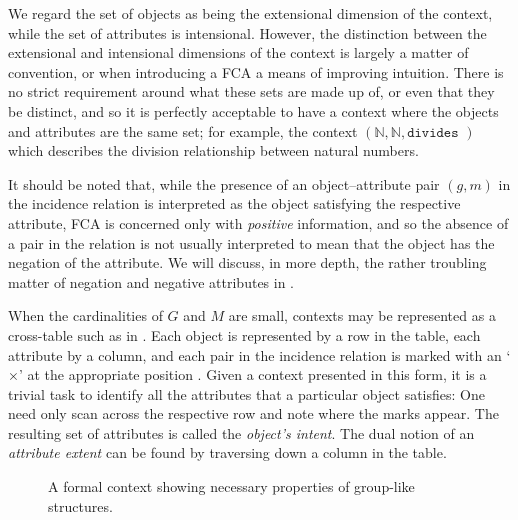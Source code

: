 We regard the set of objects as being the extensional dimension of the context, while the set of attributes is intensional. However, the
distinction between the extensional and intensional dimensions of the context is largely a matter of convention, or when introducing a FCA a
means of improving intuition. There is no strict requirement around what these sets are made up of, or even that they be distinct, and so it
is perfectly acceptable to have a context where the objects and attributes are the same set; for example, the context
$(\mathbb{N}, \mathbb{N}, \texttt{divides })$ which describes the division relationship between natural numbers.

It should be noted that, while the presence of an object--attribute pair $(g,m)$ in the incidence relation is interpreted as the object
satisfying the respective attribute, FCA is concerned only with \textit{positive} information, and so the absence of a pair in the relation is
not usually interpreted to mean that the object has the negation of the attribute. We will discuss, in more depth, the rather troubling
matter of negation and negative attributes in .

When the cardinalities of $G$ and $M$ are small, contexts may be represented as a cross-table such as in . Each object
is represented by a row in the table, each attribute by a column, and each pair in the incidence relation is marked with an `$\times$' at
the appropriate position \cite[pp. 17]{ganter1999formal}. Given a context presented in this form, it is a trivial task to identify all the
attributes that a particular object satisfies: One need only scan across the respective row and note where the marks appear. The resulting
set of attributes is called the \textit{object's intent}. The dual notion of an \textit{attribute extent} can be found by traversing down a column
in the table.

\begin{figure}[H]
  \centering
  \small
  \begin{cxt}
    \label{cxt:grouplikes}    
        
        
     
  \end{cxt}
  \caption{A formal context showing necessary properties of group-like structures.}
  \label{context:formal-context-group-structures}
\end{figure}

